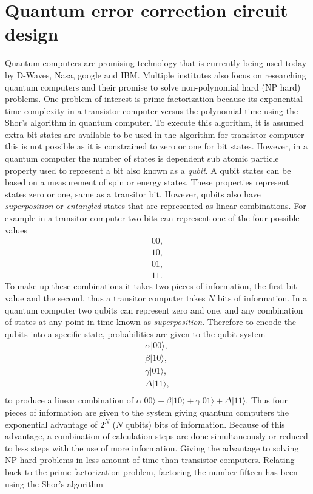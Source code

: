 \section{Quantum error correction circuit design}
\label{Qubit}
Quantum computers are promising technology that is currently being used today by D-Waves, Nasa, google and IBM. Multiple institutes also focus on researching quantum computers and their promise to solve non-polynomial hard (NP hard) problems. One problem of interest is prime factorization because its exponential time complexity in a transistor computer versus the polynomial time using the Shor's algorithm in quantum computer. To execute this algorithm, it is assumed extra bit states are
available to be used in the algorithm for transistor computer this is not possible as it is constrained to zero or one for bit states. However, in a quantum computer the number of states is dependent sub atomic particle property used to represent a bit also known as a \textit{qubit}. A qubit states can be based on a measurement of spin or energy states. These properties represent states zero or one, same as a
transitor bit. However, qubits also have \textit{superposition} or \textit{entangled} states that are represented as linear combinations. For example in a transitor computer two bits can represent one of the four possible values
\begin{align*}
    00,\\
    10,\\
    01,\\
    11.
\end{align*}
To make up these combinations it takes two pieces of information, the first bit value and the second, thus a transitor computer takes $N$ bits of information. In a quantum computer two qubits can represent zero and one, and any combination of states at any point in time known as \textit{superposition}. Therefore to encode the qubits into a specific state, probabilities are
given to the qubit system 
\begin{align*}
    \alpha |00 \rangle,\\
    \beta  |10 \rangle,\\
    \gamma |01 \rangle,\\
    \Delta |11 \rangle,\\
\end{align*}
to produce a linear combination of $\alpha |00 \rangle + \beta  |10 \rangle + \gamma |01 \rangle + \Delta |11 \rangle.$
Thus four pieces of information are given to the system giving quantum computers the exponential advantage of $2^N$ ($N$ qubits) bits of information. Because of this advantage, a combination of calculation steps are done simultaneously or reduced to less steps with the use of more information. Giving the advantage to solving NP hard problems in less amount of time than transistor computers. Relating back to the prime factorization problem, factoring the number fifteen has been using the Shor's algorithm
